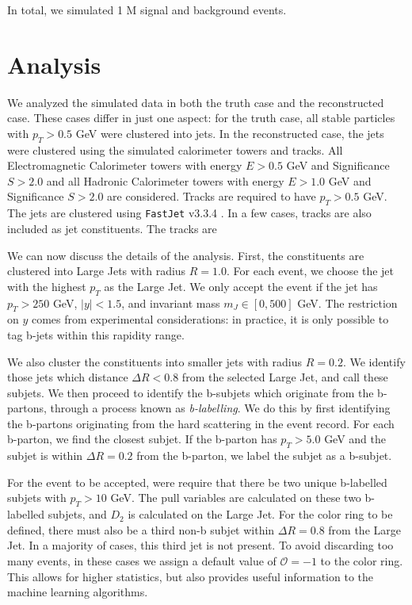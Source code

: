 \documentclass[10pt,a4paper]{book}
\def\code#1{\texttt{#1}}
\begin{document}
In total, we simulated 1 M signal and background events.


\section{Analysis}

We analyzed the simulated data in both the truth case and the reconstructed case. These cases differ in just one aspect: for the truth case, all stable particles with $p_T > 0.5$ GeV were clustered into jets. In the reconstructed case, the jets were clustered using the simulated calorimeter towers and tracks. All Electromagnetic Calorimeter towers with energy $E > 0.5$ GeV and Significance $S > 2.0$ and all Hadronic Calorimeter towers with energy $E > 1.0$ GeV and Significance $S > 2.0$ are considered. Tracks are required to have $p_T > 0.5$ GeV. The jets are clustered using \code{FastJet} v3.3.4 \cite{Cacciari:2011ma}. In a few cases, tracks are also included as jet constituents. The tracks are 

We can now discuss the details of the analysis. First, the constituents are clustered into Large Jets with radius $R=1.0$.  For  each  event,  we  choose  the jet with the highest $p_T$ as the Large Jet. We only accept the event if the jet has $p_T > 250$ GeV, $\vert y \vert < 1.5$, and invariant mass $m_J \in [0,500]$ GeV. The restriction on $y$ comes from experimental considerations: in practice, it is only possible to tag b-jets within this rapidity range.

We  also  cluster  the  constituents  into  smaller  jets with radius $R = 0.2$. We identify those jets which distance $\Delta R < 0.8$ from the selected Large Jet, and call these subjets. We then proceed to identify the b-subjets which originate from the b-partons, through a process known as \emph{b-labelling}. We do this by first identifying the b-partons originating from the hard scattering in the event record. For each b-parton, we find the closest subjet. If the b-parton has $p_T > 5.0$ GeV and the subjet is within $\Delta R = 0.2$ from the b-parton, we label the subjet as a b-subjet. 

For the event to be accepted, were require that there be two unique b-labelled subjets with $p_T > 10$ GeV. The pull variables are calculated on these two b-labelled subjets, and $D_2$ is calculated on the Large Jet. For the color ring to be defined, there must also be a third non-b subjet within $\Delta R = 0.8$ from the Large Jet. In a majority of cases, this third jet is not present. To avoid discarding too many events, in these cases we assign a default value of $\mathcal{O} = -1$ to the color ring. This allows for higher statistics, but also provides useful information to the machine learning algorithms.
\end{document}
